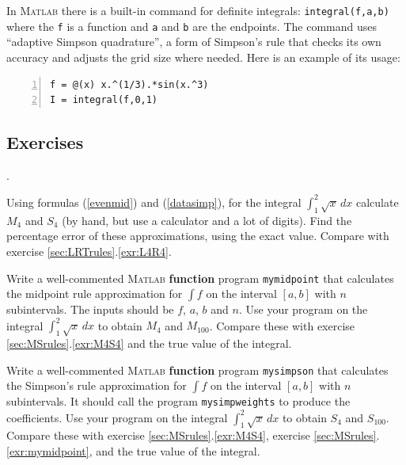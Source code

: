 In \textsc{Matlab} there is a built-in command for definite integrals:
\verb&integral(f,a,b)&
where the \verb&f& is a  function and \verb&a& and \verb&b& are
the endpoints. The command uses
``adaptive Simpson quadrature'', a form of Simpson's rule that checks
its own accuracy and adjusts the grid size where needed.
Here is an example of its usage:
\begin{lstlisting}[frame=none,numbers=left]
f = @(x) x.^(1/3).*sin(x.^3)
I = integral(f,0,1)
\end{lstlisting}

\newpage
\subsection*{Exercises}
\begin{list}
{.}{}

\item \label{exr:M4S4}
  Using formulas (\ref{evenmid}) and (\ref{datasimp}), for the
  integral $\int_1^2 \sqrt{x} \, dx$ calculate $M_4$ and $S_4$ (by
  hand, but use a calculator and a lot of digits).  Find the percentage error of these
  approximations, using the exact value. Compare with exercise 
  \ref{sec:LRTrules}.\ref{exr:L4R4}.


\item \label{exr:mymidpoint} 
  Write a well-commented \textsc{Matlab} {\bf function} program
  \verb&mymidpoint& that calculates the midpoint rule approximation
  for $\int f$ on the interval $[a,b]$ with $n$ subintervals. The
  inputs should be $f$, $a$, $b$ and $n$.  Use your program on the
  integral $\int_1^2 \sqrt{x} \, dx$ to obtain $M_4$ and $M_{100}$.
  Compare these with exercise \ref{sec:MSrules}.\ref{exr:M4S4}
  and the true value of the integral.

\item Write a well-commented \textsc{Matlab} {\bf function} program
  \verb&mysimpson& that calculates the Simpson's rule approximation
  for $\int f$ on the interval $[a,b]$ with $n$ subintervals. It
  should call the program \verb&mysimpweights& to produce the
  coefficients. Use your program on the integral $\int_1^2 \sqrt{x} \,
  dx$ to obtain $S_4$ and $S_{100}$. 
  Compare these with exercise \ref{sec:MSrules}.\ref{exr:M4S4},
  exercise  \ref{sec:MSrules}.\ref{exr:mymidpoint},
  and the true value of the integral.
\end{list}



